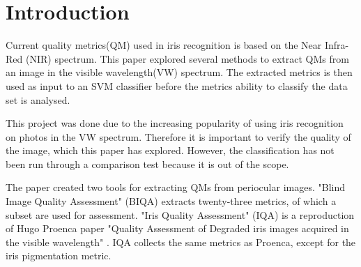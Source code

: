 \section{Introduction}
Current quality metrics(QM) used in iris recognition is based on the Near
Infra-Red (NIR) spectrum.  This paper explored several methods to extract QMs
from an image in the visible wavelength(VW) spectrum. The extracted metrics is 
then used as input to an SVM classifier before the metrics ability to classify
the data set is analysed.

This project was done due to the increasing popularity of using iris recognition
on photos in the VW spectrum.  Therefore it is important to verify the quality
of the image, which this paper has explored.  However, the classification has
not been run through a comparison test because it is out of the scope.

The paper created two tools for extracting QMs from periocular images. "Blind 
Image Quality Assessment" (BIQA) \cite{biqa} extracts twenty-three metrics, of
which a subset are used for assessment.  "Iris Quality Assessment" (IQA)
\cite{iqa} is a reproduction of Hugo Proenca paper "Quality Assessment 
of Degraded iris images acquired in the visible wavelength" \cite{hugo}. IQA 
collects the same metrics as Proenca, except for the iris pigmentation metric.

